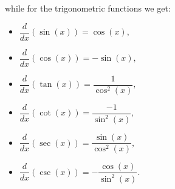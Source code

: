 \ifvc
while for the trigonometric functions we get:

\begin{minipage}[t]{.49\linewidth}
	\begin{itemize}
		\item $\dfrac{d}{dx}\left(\sin(x)\right) = \cos(x),$ 
		\item $\dfrac{d}{dx}\left(\cos(x)\right) = -\sin(x),$ 
		\item $\dfrac{d}{dx}\left(\tan(x)\right) = \dfrac{1}{\cos^2(x)},$ 
	\end{itemize}
\end{minipage}
\begin{minipage}[t]{.49\linewidth}
	\begin{itemize}
		\item $\dfrac{d}{dx}\left(\cot(x)\right) = \dfrac{-1}{\sin^2(x)},$
		\item $\dfrac{d}{dx}\left(\sec(x)\right) = \dfrac{\sin(x)}{\cos^2(x)},$ 
		\item $\dfrac{d}{dx}\left(\csc(x)\right) = -\dfrac{\cos(x)}{\sin^2(x)}.$
	\end{itemize}
\end{minipage}
\fi

